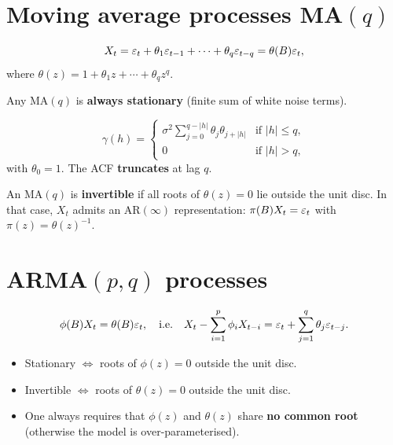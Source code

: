 \section{Moving average processes MA$(q)$}

\begin{definition}[MA$(q)$]
\[
X_t = \varepsilon_t + \theta_1\varepsilon_{t-1} + \cdots + \theta_q\varepsilon_{t-q} = \theta(B)\varepsilon_t,
\]
where $\theta(z)=1+\theta_1 z+\cdots+\theta_q z^q$.
\end{definition}

\begin{theorem}[Stationarity of an MA$(q)$]
Any MA$(q)$ is \textbf{always stationary} (finite sum of white noise terms).
\end{theorem}

\begin{theorem}[ACF of an MA$(q)$]
\[
\gamma(h) = \begin{cases}\sigma^2\sum_{j=0}^{q-|h|}\theta_j\theta_{j+|h|} & \text{if }|h|\leq q,\\0 & \text{if }|h|>q,\end{cases}
\]
with $\theta_0=1$. The ACF \textbf{truncates} at lag $q$.
\end{theorem}

\begin{definition}[Invertibility]
An MA$(q)$ is \textbf{invertible} if all roots of $\theta(z)=0$ lie outside the unit disc. In that case, $X_t$ admits an AR$(\infty)$ representation: $\pi(B)X_t=\varepsilon_t$ with $\pi(z)=\theta(z)^{-1}$.
\end{definition}

\section{ARMA$(p,q)$ processes}

\begin{definition}[ARMA$(p,q)$]
\[
\phi(B)X_t = \theta(B)\varepsilon_t, \quad\text{i.e.}\quad X_t - \sum_{i=1}^p\phi_i X_{t-i} = \varepsilon_t + \sum_{j=1}^q\theta_j\varepsilon_{t-j}.
\]
\end{definition}

\begin{theorem}
\begin{itemize}
\item Stationary $\iff$ roots of $\phi(z)=0$ outside the unit disc.
\item Invertible $\iff$ roots of $\theta(z)=0$ outside the unit disc.
\item One always requires that $\phi(z)$ and $\theta(z)$ share \textbf{no common root} (otherwise the model is over-parameterised).
\end{itemize}
\end{theorem}

